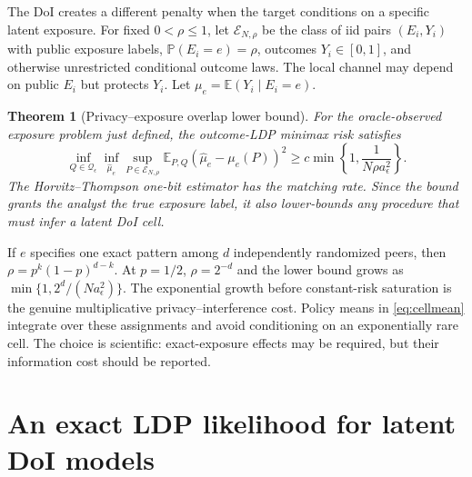 \documentclass[10pt]{article}
\newtheorem{theorem}{Theorem}
\theoremstyle{definition}
\theoremstyle{remark}
\newcommand{\E}{\mathbb{E}}
\newcommand{\Pp}{\mathbb{P}}
\newcommand{\doisig}{a_{\epsilon}}
\begin{document}
The DoI creates a different penalty when the target conditions on a specific latent exposure.
For fixed $0<\rho\le1$, let $\mathcal E_{N,\rho}$ be the class of iid pairs $(E_i,Y_i)$ with
public exposure labels,
$\Pp(E_i=e)=\rho$, outcomes $Y_i\in[0,1]$, and otherwise unrestricted conditional outcome
laws. The local channel may depend on public $E_i$ but protects $Y_i$. Let
$\mu_e=\E(Y_i\mid E_i=e)$.

\begin{theorem}[Privacy--exposure overlap lower bound]
\label{thm:overlap}
For the oracle-observed exposure problem just defined, the outcome-LDP minimax risk satisfies
\begin{equation}
  \inf_{Q\in\mathcal Q_{\epsilon}}\inf_{\widehat\mu_e}
  \sup_{P\in\mathcal E_{N,\rho}}\E_{P,Q}(\widehat\mu_e-\mu_e(P))^2
  \ge c\min\!\left\{1,\frac{1}{N\rho\doisig^2}\right\}.
  \label{eq:overlap}
\end{equation}
The Horvitz--Thompson one-bit estimator has the matching rate. Since the bound grants the
analyst the true exposure label, it also lower-bounds any procedure that must infer a latent
DoI cell.
\end{theorem}

If $e$ specifies one exact pattern among $d$ independently randomized peers, then
$\rho=p^k(1-p)^{d-k}$. At $p=1/2$, $\rho=2^{-d}$ and the lower bound grows as
$\min\{1,2^d/(N\doisig^2)\}$. The exponential growth before constant-risk saturation is the
genuine multiplicative privacy--interference cost. Policy
means in \eqref{eq:cellmean} integrate over these assignments and avoid conditioning on an
exponentially rare cell. The choice is scientific: exact-exposure effects may be required, but
their information cost should be reported.

\section{An exact LDP likelihood for latent DoI models}
\label{sec:doi}
\end{document}
